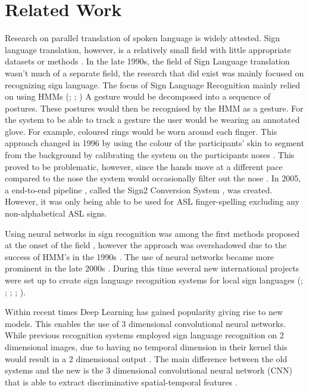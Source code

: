 \section{Related Work}

Research on parallel translation of spoken language is widely attested. Sign language translation, however, is a relatively small field with little appropriate datasets or methods \cite{camgoz2021content4all} \cite{bragg2019sign}. In the late 1990s, the field of Sign Language translation wasn't much of a separate field, the research that did exist was mainly focused on recognizing sign language. The focus of Sign Language Recognition mainly relied on using HMMs (\citealp{hiddenmarkov1l}; \citealp{hiddenmarkov2}; \citealp{hiddenmarkov3}) \cite{holden2005australian} A gesture would be decomposed into a sequence of postures. These postures would then be recognised by the HMM as a gesture. For the system to be able to track a gesture the user would be wearing an annotated glove. For example, coloured rings would be worn around each finger. This approach changed in 1996 by using the colour of the participants' skin to segment from the background by calibrating the system on the participants noses \cite{starner1998real}. This proved to be problematic, however, since the hands move at a different pace compared to the nose the system would occasionally filter out the nose \cite{starner1998real}. In 2005, a end-to-end pipeline , called the Sign2 Conversion System \cite{glenn2005image}, was created. However, it was only being able to be used for ASL finger-spelling excluding any non-alphabetical ASL signs.

Using neural networks in sign recognition was among the first methods proposed at the onset of the field \cite{murakami1991gesture} \cite{fels1993glove}, however the approach was overshadowed due to the success of HMM's in the 1990s \cite{cooper2011sign}. The use of neural networks became more prominent in the late 2000s \cite{parton2006sign}. During this time several new international projects were set up to create sign language recognition systems for local sign languages (\citealp{ethopia}; \citealp{malaysia}; \citealp{persia}; \citealp{brazil}; \citealp{arabia}). 

Within recent times Deep Learning \cite{lecun2015deep} has gained popularity giving rise to new models. This enables the use of 3 dimensional convolutional neural networks. While previous recognition systems employed sign language recognition on 2 dimensional images, due to having no temporal dimension in their kernel this would result in a 2 dimensional output \cite{tran2015learning}. The main difference between the old systems and the new is the 3 dimensional convolutional neural network (CNN) that is able to extract discriminative spatial-temporal features \cite{huang2015sign}.

